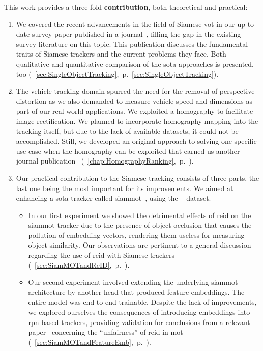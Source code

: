 This work provides a three-fold \textbf{contribution}, both theoretical and practical:
\begin{enumerate}
    \item We covered the recent advancements in the field of Siamese \gls{vot} in our up-to-date survey paper published in a journal~\cite{ondrasovic2021siamese}, filling the gap in the existing survey literature on this topic. This publication discusses the fundamental traits of Siamese trackers and the current problems they face. Both qualitative and quantitative comparison of the \gls{sota} approaches is presented, too (\sectiontext{}~\ref{sec:SingleObjectTracking},~p.~\ref{sec:SingleObjectTracking}).
    \item The vehicle tracking domain spurred the need for the removal of perspective distortion as we also demanded to measure vehicle speed and dimensions as part of our real-world applications. We exploited a homography to facilitate image rectification. We planned to incorporate homography mapping into the tracking itself, but due to the lack of available datasets, it could not be accomplished. Still, we developed an original approach to solving one specific use case when the homography can be exploited that earned us another journal publication~\cite{ondrasovic2021homography} (\chaptertext{}~\ref{chap:HomographyRanking},~p.~\pageref{chap:HomographyRanking}).
    \item Our practical contribution to the Siamese tracking consists of three parts, the last one being the most important for its improvements. We aimed at enhancing a \gls{sota} tracker called \gls{siammot}~\cite{shuai2021siammot}, using the \uadetrac{}~\cite{wen2020uadetrac} dataset.
          \begin{itemize}
              \item In our first experiment we showed the detrimental effects of \gls{reid} on the \gls{siammot} tracker due to the presence of object occlusion that causes the pollution of embedding vectors, rendering them useless for measuring object similarity. Our observations are pertinent to a general discussion regarding the use of \gls{reid} with Siamese trackers (\sectiontext{}~\ref{sec:SiamMOTandReID},~p.~\pageref{sec:SiamMOTandReID}).
              \item Our second experiment involved extending the underlying \gls{siammot} architecture by another head that produced feature embeddings. The entire model was end-to-end trainable. Despite the lack of improvements, we explored ourselves the consequences of introducing embeddings into \gls{rpn}-based trackers, providing validation for conclusions from a relevant paper~\cite{zhang2021fairmot} concerning the ``unfairness'' of \gls{reid} in \gls{mot} (\sectiontext{}~\ref{sec:SiamMOTandFeatureEmb},~p.~\pageref{sec:SiamMOTandFeatureEmb}).

\end{itemize}
\end{enumerate}
